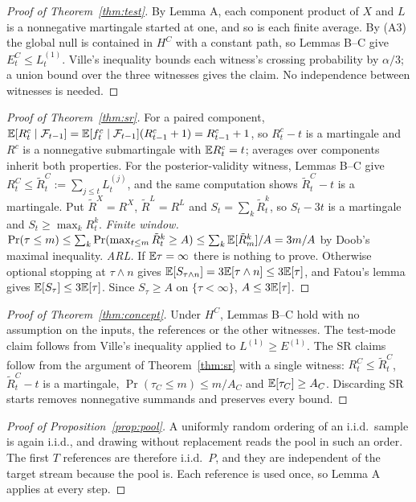 \begin{proof}[Proof of Theorem~\ref{thm:test}]
By Lemma A, each component product of $X$ and $L$ is a nonnegative martingale started at one, and so is each finite average. By (A3) the global null is contained in $H^C$ with a constant path, so Lemmas B--C give $E^C_t\le L^{(1)}_t$. Ville's inequality bounds each witness's crossing probability by $\alpha/3$; a union bound over the three witnesses gives the claim. No independence between witnesses is needed.
\end{proof}

\begin{proof}[Proof of Theorem~\ref{thm:sr}]
For a paired component, $\mathbb{E}[R^c_t\mid\mathcal F_{t-1}]=\mathbb{E}[f^c_t\mid\mathcal F_{t-1}](R^c_{t-1}+1)=R^c_{t-1}+1$, so $R^c_t-t$ is a martingale and $R^c$ is a nonnegative submartingale with $\mathbb{E} R^c_t=t$; averages over components inherit both properties. For the posterior-validity witness, Lemmas B--C give $R^C_t\le\tilde R^C_t:=\sum_{j\le t}L^{(j)}_t$, and the same computation shows $\tilde R^C_t-t$ is a martingale. Put $\tilde R^X=R^X$, $\tilde R^L=R^L$ and $S_t=\sum_k\tilde R^k_t$, so $S_t-3t$ is a martingale and $S_t\ge\max_kR^k_t$.
\emph{Finite window.} $\Pr(\tau\le m)\le\sum_k\Pr(\max_{t\le m}\tilde R^k_t\ge A)\le\sum_k\mathbb{E}[\tilde R^k_m]/A=3m/A$ by Doob's maximal inequality.
\emph{ARL.} If $\mathbb{E}\tau=\infty$ there is nothing to prove. Otherwise optional stopping at $\tau\wedge n$ gives $\mathbb{E}[S_{\tau\wedge n}]=3\mathbb{E}[\tau\wedge n]\le3\mathbb{E}[\tau]$, and Fatou's lemma gives $\mathbb{E}[S_\tau]\le3\mathbb{E}[\tau]$. Since $S_\tau\ge A$ on $\{\tau<\infty\}$, $A\le3\mathbb{E}[\tau]$.
\end{proof}

\begin{proof}[Proof of Theorem~\ref{thm:concept}]
Under $H^C$, Lemmas B--C hold with no assumption on the inputs, the references or the other witnesses. The test-mode claim follows from Ville's inequality applied to $L^{(1)}\ge E^{(1)}$. The SR claims follow from the argument of Theorem~\ref{thm:sr} with a single witness: $R^C_t\le\tilde R^C_t$, $\tilde R^C_t-t$ is a martingale, $\Pr(\tau_C\le m)\le m/A_C$ and $\mathbb{E}[\tau_C]\ge A_C$. Discarding SR starts removes nonnegative summands and preserves every bound.
\end{proof}

\begin{proof}[Proof of Proposition~\ref{prop:pool}]
A uniformly random ordering of an i.i.d.\ sample is again i.i.d., and drawing without replacement reads the pool in such an order. The first $T$ references are therefore i.i.d.\ $P$, and they are independent of the target stream because the pool is. Each reference is used once, so Lemma A applies at every step.
\end{proof}

